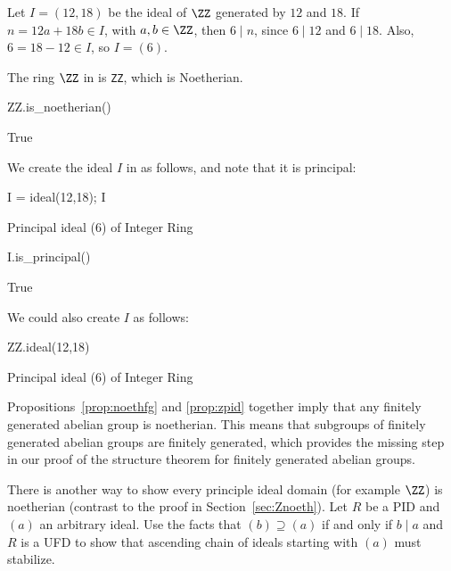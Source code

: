 \begin{example}
Let $I=(12,18)$ be the ideal of $\ZZ$ generated by $12$ and $18$.
If $n=12a+18b\in I$, with $a,b\in\ZZ$,
then $6\mid n$, since $6\mid 12$ and $6\mid 18$.
Also, $6=18-12\in I$, so $I=(6)$.

The ring $\ZZ$
in {\Sage} is {\tt ZZ}, which is Noetherian.
\begin{sagecode}
\begin{sagecell}
ZZ.is_noetherian()
\end{sagecell}
\begin{sageout}
True
\end{sageout}
\end{sagecode}
We create the ideal $I$ in {\Sage} as follows, and note that
it is principal:
\begin{sagecode}
\begin{sagecell}
I = ideal(12,18); I
\end{sagecell}
\begin{sageout}
Principal ideal (6) of Integer Ring
\end{sageout}
\begin{sagecell}
I.is_principal()
\end{sagecell}
\begin{sageout}
True
\end{sageout}
\end{sagecode}
We could also create $I$ as follows:
\begin{sagecode}
\begin{sagecell}
ZZ.ideal(12,18)
\end{sagecell}
\begin{sageout}
Principal ideal (6) of Integer Ring
\end{sageout}
\end{sagecode}
\end{example}

Propositions~\ref{prop:noethfg} and \ref{prop:zpid} together imply that
any finitely generated abelian group is noetherian.  This means that
subgroups of finitely generated abelian groups are finitely generated,
which provides the missing step in our proof of the structure theorem
for finitely generated abelian groups.

\begin{exercise}
  There is another way to show every principle ideal domain (for example $\ZZ$) is noetherian (contrast to the proof in Section~\ref{sec:Znoeth}). Let $R$ be a PID and $(a)$ an arbitrary ideal. Use the facts that $(b)\supseteq(a)$ if and only if $b \mid a$ and $R$ is a UFD to show that ascending chain of ideals starting with $(a)$ must stabilize.
\end{exercise}

